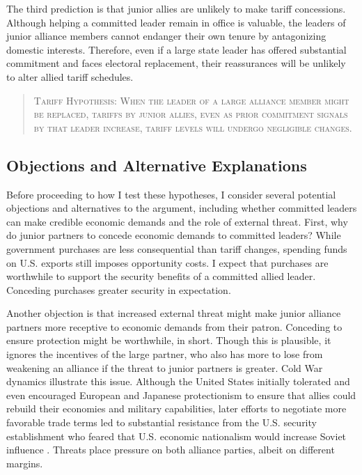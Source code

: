 \documentclass[12pt]{article}
\begin{document}
The third prediction is that junior allies are unlikely to make tariff concessions. 
Although helping a committed leader remain in office is valuable, the leaders of junior alliance members cannot endanger their own tenure by antagonizing domestic interests.
Therefore, even if a large state leader has offered substantial commitment and faces electoral replacement, their reassurances will be unlikely to alter allied tariff schedules. 


\begin{quote}
\textsc{Tariff Hypothesis:  When the leader of a large alliance member might be replaced, tariffs by junior allies, even as prior commitment signals by that leader increase, tariff levels will undergo negligible changes. }
\end{quote}



\subsection{Objections and Alternative Explanations}


Before proceeding to how I test these hypotheses, I consider several potential objections and alternatives to the argument, including whether committed leaders can make credible economic demands and the role of external threat.
First, why do junior partners to concede economic demands to committed leaders? 
While government purchases are less consequential than tariff changes, spending funds on U.S. exports still imposes opportunity costs.
I expect that purchases are worthwhile to support the security benefits of a committed allied leader. 
Conceding purchases greater security in expectation. 


Another objection is that increased external threat might make junior alliance partners more receptive to economic demands from their patron.
Conceding to ensure protection might be worthwhile, in short.
Though this is plausible, it ignores the incentives of the large partner, who also has more to lose from weakening an alliance if the threat to junior partners is greater. 
Cold War dynamics illustrate this issue.
Although the United States initially tolerated and even encouraged European and Japanese protectionism to ensure that allies could rebuild their economies and military capabilities, later efforts to negotiate more favorable trade terms led to substantial resistance from the U.S. security establishment who feared that U.S. economic nationalism would increase Soviet influence \citep{Mastanduno1998}.
Threats place pressure on both alliance parties, albeit on different margins.
\end{document}

